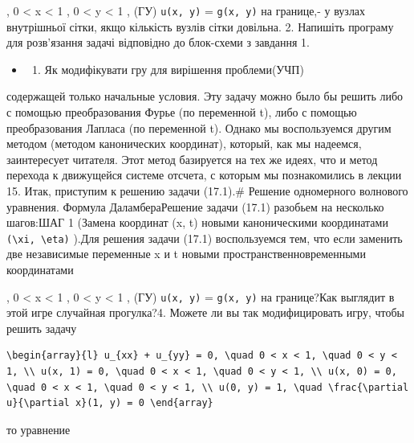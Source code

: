 \documentclass[
  ukrainian,
]{article}
\providecommand{\tightlist}{%
  \setlength{\itemsep}{0pt}\setlength{\parskip}{0pt}}
\begin{document}
, 0 \textless{} x \textless{} 1 , 0 \textless{} y \textless{} 1 , (ГУ)
\texttt{u(x,\ y)} = \texttt{g(x,\ y)} на границе,- у вузлах внутрішньої
сітки, якщо кількість вузлів сітки довільна. 2. Напишіть програму для
розв'язання задачі відповідно до блок-схеми з завдання 1.

\begin{itemize}
\tightlist
\item
  \begin{enumerate}
  \def\labelenumi{\arabic{enumi}.}
  \setcounter{enumi}{2}
  \tightlist
  \item
    Як модифікувати гру для вирішення проблеми(УЧП)
  \end{enumerate}
\end{itemize}

содержащей только начальные условия. Эту задачу можно было бы решить
либо с помощью преобразования Фурье (по переменной t), либо с помощью
преобразования Лапласа (по переменной t). Однако мы воспользуемся другим
методом (методом канонических координат), который, как мы надеемся,
заинтересует читателя. Этот метод базируется на тех же идеях, что и
метод перехода к движущейся системе отсчета, с которым мы познакомились
в лекции 15. Итак, приступим к решению задачи (17.1).\# Решение
одномерного волнового уравнения. Формула ДаламбераРешение задачи (17.1)
разобьем на несколько шагов:ШАГ 1 (Замена координат (x, t) новыми
каноническими координатами
\texttt{(\textbackslash{}xi,\ \textbackslash{}eta)} ).Для решения задачи
(17.1) воспользуемся тем, что если заменить две независимые переменные x
и t новыми пространственновременными координатами

, 0 \textless{} x \textless{} 1 , 0 \textless{} y \textless{} 1 , (ГУ)
\texttt{u(x,\ y)} = \texttt{g(x,\ y)} на границе?Как выглядит в этой
игре случайная прогулка?4. Можете ли вы так модифицировать игру, чтобы
решить задачу

\begin{verbatim}
\begin{array}{l} u_{xx} + u_{yy} = 0, \quad 0 < x < 1, \quad 0 < y < 1, \\ u(x, 1) = 0, \quad 0 < x < 1, \quad 0 < y < 1, \\ u(x, 0) = 0, \quad 0 < x < 1, \quad 0 < y < 1, \\ u(0, y) = 1, \quad \frac{\partial u}{\partial x}(1, y) = 0 \end{array}
\end{verbatim}

то уравнение
\end{document}

